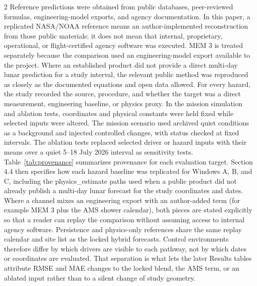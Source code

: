 \begin{multicols}{2}
Reference predictions were obtained from public databases, peer-reviewed formulas, engineering-model exports, and agency documentation. In this paper, a replicated NASA/NOAA reference means an author-implemented reconstruction from those public materials; it does not mean that internal, proprietary, operational, or flight-certified agency software was executed. MEM 3 is treated separately because the comparison used an engineering-model export available to the project. Where an established product did not provide a direct multi-day lunar prediction for a study interval, the relevant public method was reproduced as closely as the documented equations and open data allowed. For every hazard, the study recorded the source, procedure, and whether the target was a direct measurement, engineering baseline, or physics proxy. In the mission simulation and ablation tests, coordinates and physical constants were held fixed while selected inputs were altered. The mission scenario used archived quiet conditions as a background and injected controlled changes, with status checked at fixed intervals. The ablation tests replaced selected driver or hazard inputs with their means over a quiet 5--18 July 2026 interval as sensitivity tests. Table~\ref{tab:provenance} summarizes provenance for each evaluation target. Section 4.4 then specifies how each hazard baseline was replicated for Windows A, B, and C, including the physics\_estimate paths used when a public product did not already publish a multi-day lunar forecast for the study coordinates and dates. Where a channel mixes an engineering export with an author-added term (for example MEM 3 plus the AMS shower calendar), both pieces are stated explicitly so that a reader can replay the comparison without assuming access to internal agency software. Persistence and physics-only references share the same replay calendar and site list as the locked hybrid forecasts. Control environments therefore differ by which drivers are visible to each pathway, not by which dates or coordinates are evaluated. That separation is what lets the later Results tables attribute RMSE and MAE changes to the locked blend, the AMS term, or an ablated input rather than to a silent change of study geometry.
\end{multicols}

